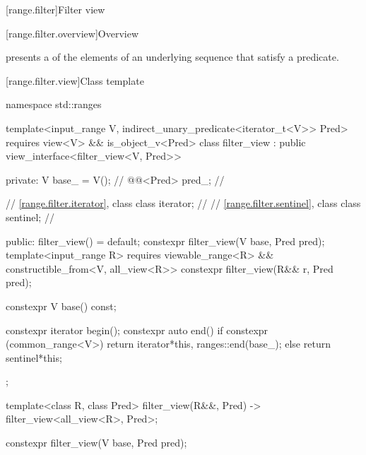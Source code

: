 [range.filter]{Filter view}

[range.filter.overview]{Overview}

\pnum
{} presents a  of the elements
of an underlying sequence that satisfy a predicate.

\pnum
\begin{example}
\end{example}

[range.filter.view]{Class template }

%
\begin{codeblock}
namespace std::ranges {
  template<input_range V, indirect_unary_predicate<iterator_t<V>> Pred>
    requires view<V> && is_object_v<Pred>
  class filter_view : public view_interface<filter_view<V, Pred>> {
  private:
    V base_ = V();                      // \expos
    @@<Pred> pred_;  // \expos

    // \ref{range.filter.iterator}, class 
    class iterator;                     // \expos
    // \ref{range.filter.sentinel}, class 
    class sentinel;                     // \expos

  public:
    filter_view() = default;
    constexpr filter_view(V base, Pred pred);
    template<input_range R>
      requires viewable_range<R> && constructible_from<V, all_view<R>>
    constexpr filter_view(R&& r, Pred pred);

    constexpr V base() const;

    constexpr iterator begin();
    constexpr auto end() {
      if constexpr (common_range<V>)
        return iterator{*this, ranges::end(base_)};
      else
        return sentinel{*this};
    }
  };

  template<class R, class Pred>
    filter_view(R&&, Pred) -> filter_view<all_view<R>, Pred>;
}
\end{codeblock}

%
\begin{itemdecl}
constexpr filter_view(V base, Pred pred);
\end{itemdecl}

